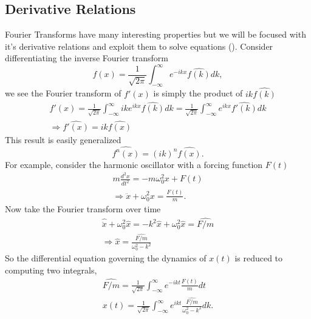 \documentclass{article}
\begin{document}
\subsection{Derivative Relations}
Fourier Transforms have many interesting properties but we will be focused with it's derivative relations and exploit them to solve equations (). Consider differentiating the inverse Fourier transform
\begin{equation*}
f(x) = \frac{1}{\sqrt{2\pi}}\int_{-\infty}^{\infty}e^{-ikx}\widehat{f(k)} dk,
\end{equation*}
we see the Fourier transform of $f'(x)$ is simply the product of $ik\widehat{f(k)}$
\begin{gather*}
f'(x) = \frac{1}{\sqrt{2\pi}}\int_{-\infty}^{\infty}ike^{ikx}\widehat{f(k)} dk = \frac{1}{\sqrt{2\pi}}\int_{-\infty}^{\infty}e^{ikx}\widehat{f'(k)}dk\\
\Rightarrow \widehat{f'(x)} = ik\widehat{f(x)}
\end{gather*}
This result is easily generalized
\begin{equation*}
\widehat{f^n(x)} = (ik)^n\widehat{f(x)}.
\end{equation*}
For example, consider the harmonic oscillator with a forcing function $F(t)$
\begin{gather*}
m\frac{d^2x}{dt^2}=-m\omega_0^2 x + F(t)\\
\Rightarrow \ddot{x} + \omega_0^2 x = \frac{F(t)}{m}.
\end{gather*}
Now take the Fourier transform over time
\begin{gather*}
\widehat{\ddot{x}} + \omega_0^2\widehat{x} =-k^2\widehat{x} + \omega_0^2\widehat{x}= \widehat{F/m}\\
\Rightarrow \widehat{x} = \frac{\widehat{F/m}}{\omega_0^2 - k^2}
\end{gather*}
So the differential equation governing the dynamics of $x(t)$ is reduced to computing two integrals, 
\begin{gather*}
\widehat{F/m} = \frac{1}{\sqrt{2\pi}}\int_{-\infty}^{\infty}e^{-ikt} \frac{F(t)}{m} dt\\
x(t) = \frac{1}{\sqrt{2\pi}}\int_{-\infty}^{\infty} e^{ikt}\frac{\widehat{F/m}}{\omega_0^2 - k^2} dk.
\end{gather*}
\end{document}
